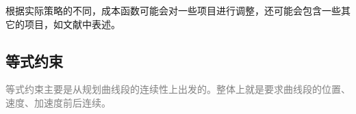     
    

根据实际策略的不同，成本函数可能会对一些项目进行调整，还可能会包含一些其它的项目，如文献中表述\cite[p4]{Bellicoso_Jenelten_Gehring_Hutter_2018}。

\subsection[等式约束]{等式约束}

\textcolor{gray}{\small
    等式约束主要是从规划曲线段的连续性上出发的。整体上就是要求曲线段的位置、速度、加速度前后连续。}

